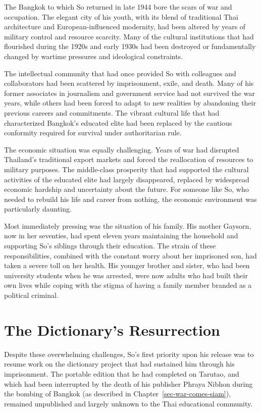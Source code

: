 \documentclass[
  Letterpaper,
]{scrbook}
\begin{document}
The Bangkok to which So returned in late 1944 bore the scars of war and
occupation. The elegant city of his youth, with its blend of traditional
Thai architecture and European-influenced modernity, had been altered by
years of military control and resource scarcity. Many of the cultural
institutions that had flourished during the 1920s and early 1930s had
been destroyed or fundamentally changed by wartime pressures and
ideological constraints.

The intellectual community that had once provided So with colleagues and
collaborators had been scattered by imprisonment, exile, and death. Many
of his former associates in journalism and government service had not
survived the war years, while others had been forced to adapt to new
realities by abandoning their previous careers and commitments. The
vibrant cultural life that had characterized Bangkok's educated elite
had been replaced by the cautious conformity required for survival under
authoritarian rule.

The economic situation was equally challenging. Years of war had
disrupted Thailand's traditional export markets and forced the
reallocation of resources to military purposes. The middle-class
prosperity that had supported the cultural activities of the educated
elite had largely disappeared, replaced by widespread economic hardship
and uncertainty about the future. For someone like So, who needed to
rebuild his life and career from nothing, the economic environment was
particularly daunting.

Most immediately pressing was the situation of his family. His mother
Gaysorn, now in her seventies, had spent eleven years maintaining the
household and supporting So's siblings through their education. The
strain of these responsibilities, combined with the constant worry about
her imprisoned son, had taken a severe toll on her health. His younger
brother and sister, who had been university students when he was
arrested, were now adults who had built their own lives while coping
with the stigma of having a family member branded as a political
criminal.

\section{The Dictionary's
Resurrection}\label{the-dictionarys-resurrection}

Despite these overwhelming challenges, So's first priority upon his
release was to resume work on the dictionary project that had sustained
him through his imprisonment. The portable edition that he had completed
on Tarutao, and which had been interrupted by the death of his publisher
Phraya Nibhon during the bombing of Bangkok (as described in
Chapter~\ref{sec-war-comes-siam}), remained unpublished and largely
unknown to the Thai educational community.
\end{document}

